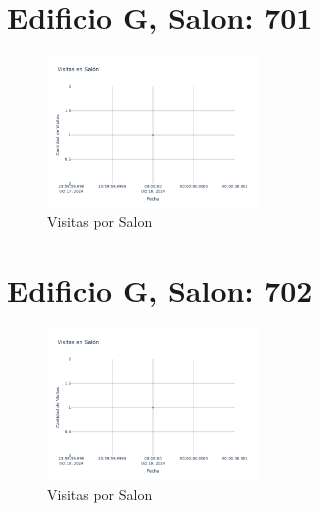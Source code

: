 \documentclass{article}
\begin{document}
    

    \section{Edificio G, Salon: 701}
    \begin{figure}
        \centering
        \includegraphics[width=0.5\textwidth]{../img/poli/VS701-90Dias-03-12-2024.png}
        \caption{Visitas por Salon}
    \end{figure}

    

    \section{Edificio G, Salon: 702}
    \begin{figure}
        \centering
        \includegraphics[width=0.5\textwidth]{../img/poli/VS702-90Dias-03-12-2024.png}
        \caption{Visitas por Salon}
    \end{figure}

    
\end{document}
